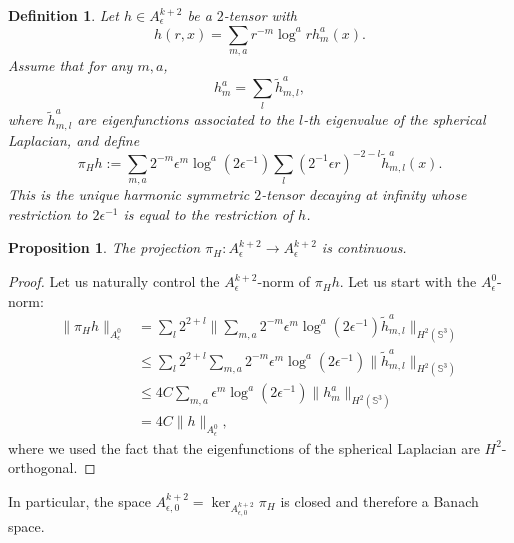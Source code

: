 \documentclass[12pt]{article}
\newtheorem{prop}[thm]{Proposition}
\newtheorem{defn}[thm]{Definition}
\begin{document}
    \begin{defn}
        Let $h\in A^{k+2}_\epsilon$ be a $2$-tensor with $$h(r,x) = \sum_{m,a}r^{-m}\log^a{r}h_m^a(x).$$
        Assume that for any $m,a$, $$h_m^a=\sum_l\tilde{h}_{m,l}^a,$$
        where $\tilde{h}_{m,l}^a$ are eigenfunctions associated to the $l$-th eigenvalue of the spherical Laplacian, and define
        $$\pi_Hh:= \sum_{m,a}2^{-m}\epsilon^m\log^a(2\epsilon^{-1})\sum_l(2^{-1}\epsilon r)^{-2-l}\tilde{h}_{m,l}^a(x).$$
        This is the unique harmonic symmetric $2$-tensor decaying at infinity whose restriction to $ 2\epsilon^{-1} $ is equal to the restriction of $h$.
    \end{defn}
    \begin{prop}
        The projection $\pi_H: A^{k+2}_\epsilon\to A^{k+2}_\epsilon$ is continuous.
    \end{prop}
    \begin{proof}
        Let us naturally control the $A_\epsilon^{k+2}$-norm of $\pi_Hh$. Let us start with the $A_\epsilon^0$-norm:
        \begin{align*}
            \|\pi_Hh\|_{A_\epsilon^0} &= \sum_l 2^{2+l} \Big\|\sum_{m,a}2^{-m}\epsilon^m\log^a(2\epsilon^{-1})\tilde{h}_{m,l}^a \Big\|_{H^2(\mathbb{S}^3)}\\
            &\leqslant\sum_l 2^{2+l} \sum_{m,a}2^{-m}\epsilon^m\log^a(2\epsilon^{-1})\|\tilde{h}_{m,l}^a \|_{H^2(\mathbb{S}^3)}\\
            &\leqslant  4C\sum_{m,a}\epsilon^m\log^a(2\epsilon^{-1}) \|h_{m}^a \|_{H^2(\mathbb{S}^3)}\\
            &=4C\|h\|_{A_\epsilon^0},
        \end{align*}
        where we used the fact that the eigenfunctions of the spherical Laplacian are $H^2$-orthogonal.
        
    \end{proof}
    
    In particular, the space $A_{\epsilon,0}^{k+2} = \ker_{A_{\epsilon,0}^{k+2}} \pi_H$ is closed and therefore a Banach space.
    
\end{document}
